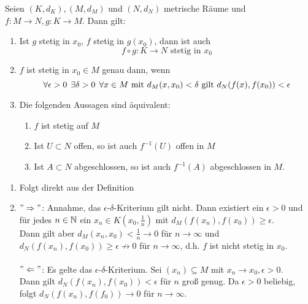 \begin{prop} \label{prop:4.13}
	Seien $(K,d_{K}), (M, d_{M})$ und $(N, d_{N})$ metrische Räume und $f \colon M \rightarrow N, g \colon K \rightarrow M$. Dann gilt:
	\begin{enumerate}[label=\alph*\upshape)]
		\item Ist $g$ stetig in $x_{0}$, $f$ stetig in $g(x_{0})$, dann ist auch 
			\[ f \circ g \colon K \rightarrow N \text{ stetig in } x_{0} \]
		\item \label{prop:4.13.b} $f$ ist stetig in $x_{0} \in M$ genau dann, wenn 
			\[ \forall \epsilon > 0 \hspace{0.15cm} \exists \delta > 0 \hspace{0.15cm} \forall x \in M \text{ mit } d_{M}(x, x_{0}) < \delta \text{ gilt } d_{N}(f(x), f(x_{0})) < \epsilon \]
		\item Die folgenden Aussagen sind äquivalent:
			\begin{enumerate}[label=(\roman*\upshape)]
				\item $f$ ist stetig auf $M$
				\item Ist $U \subset N$ offen, so ist auch $f^{-1}(U)$ offen in $M$
				\item Ist $A \subset N$ abgeschlossen, so ist auch $f^{-1}(A)$ abgeschlossen in $M$.
			\end{enumerate}
	\end{enumerate}	
	\begin{beweis}		
		\begin{enumerate}[label=\alph*\upshape)]	
			\item Folgt direkt aus der Definition
			\item $" \Rightarrow "$: Annahme, das $\epsilon$-$\delta$-Kriterium gilt nicht. Dann existiert ein $\epsilon > 0$ und für jedes $n \in \mathbb{N}$ ein $x_{n} \in K(x_{0}, \frac{1}{n})$ mit $d_{M}(f(x_{n}), f(x_{0})) \geq \epsilon$. \\
				Dann gilt aber $d_{M}(x_{n}, x_{0}) < \frac{1}{n} \rightarrow 0$ für $n \rightarrow \infty$ und $d_{N}(f(x_{n}), f(x_{0})) \geq \epsilon \not\rightarrow 0$ für $n \rightarrow \infty$, d.h. $f$ ist nicht stetig in $x_{0}$. \\ \\
				$" \Leftarrow "$: Es gelte das $\epsilon$-$\delta$-Kriterium. Sei $(x_{n}) \subseteq M$ mit $x_{n} \rightarrow x_{0}, \epsilon > 0$. \\
				Dann gilt $d_{N}(f(x_{n}), f(x_{0})) < \epsilon$ für $n$ gro{\ss} genug. Da $\epsilon > 0$ beliebig, folgt $d_{N}(f(x_{n}), f(f_{0})) \rightarrow 0$ für $n \rightarrow \infty$.

\end{enumerate}
\end{beweis}
\end{prop}

